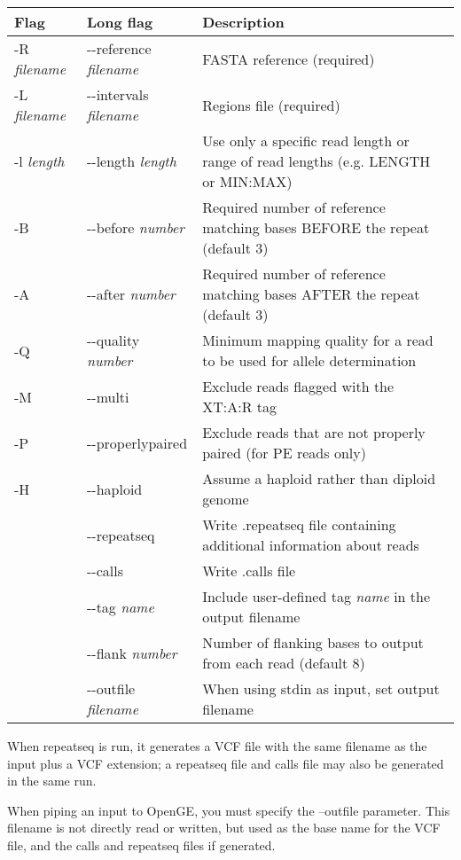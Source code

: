 \documentclass[11pt]{article}
\begin{document}
\begin{center}
\begin{tabular}{llp{3.5in}}
\hline
Flag&Long flag&Description\\ \hline
 -R \textit{filename}&{-}{-}reference \textit{filename}&FASTA reference (required)\\
 -L \textit{filename}&{-}{-}intervals \textit{filename}&Regions file (required)\\
 -l \textit{length}&{-}{-}length \textit{length}&Use only a specific read length or range of read lengths (e.g. LENGTH or MIN:MAX)\\
 -B&{-}{-}before \textit{number}&Required number of reference matching bases BEFORE the repeat (default 3)\\
 -A&{-}{-}after \textit{number}&Required number of reference matching bases AFTER the repeat (default 3)\\
 -Q&{-}{-}quality \textit{number}&Minimum mapping quality for a read to be used for allele determination\\
 -M&{-}{-}multi&Exclude reads flagged with the XT:A:R tag\\
 -P&{-}{-}properlypaired&Exclude reads that are not properly paired (for PE reads only)\\
 -H&{-}{-}haploid&Assume a haploid rather than diploid genome\\
 &{-}{-}repeatseq&Write .repeatseq file containing additional information about reads\\
 &{-}{-}calls&Write .calls file\\
 &{-}{-}tag \textit{name}&Include user-defined tag \textit{name} in the output filename\\
 &{-}{-}flank \textit{number}&Number of flanking bases to output from each read (default 8)\\
 &{-}{-}outfile \textit{filename}&When using stdin as input, set output filename\\
\end{tabular}
\end{center}

When repeatseq is run, it generates a VCF file with the same filename as the input plus a VCF extension; a repeatseq file and calls file may also be generated in the same run.

When piping an input to OpenGE, you must specify the --outfile parameter. This filename is not directly read or written, but used as the base name for the VCF file, and the calls and repeatseq files if generated.
\end{document}
